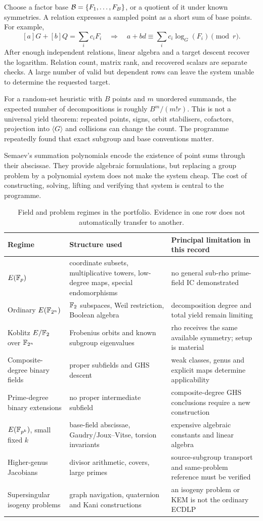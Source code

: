 Choose a factor base $\mathcal B=\{F_1,\ldots,F_B\}$, or a quotient of it under
known symmetries. A relation expresses a sampled point as a short sum of
base points. For example,
\[
 [a]G+[b]Q=\sum_i c_iF_i
 \quad\Longrightarrow\quad
 a+bd\equiv\sum_i c_i\log_G(F_i)\pmod r.
\]
After enough independent relations, linear algebra and a target descent
recover the logarithm. Relation count, matrix rank, and recovered scalars
are separate checks. A large number of valid but dependent rows can leave
the system unable to determine the requested target.

For a random-set heuristic with $B$ points and $m$ unordered summands, the
expected number of decompositions is roughly $B^m/(m!r)$. This is not a
universal yield theorem: repeated points, signs, orbit stabilisers,
cofactors, projection into $\langle G\rangle$ and collisions can change the
count. The programme repeatedly found that exact subgroup and base
conventions matter.

Semaev's summation polynomials encode the existence of point sums through
their abscissae. They provide algebraic formulations, but replacing a group
problem by a polynomial system does not make the system cheap. The cost
of constructing, solving, lifting and verifying that system is central to
the programme.\cite{semaev2004}

\begin{table}[htbp]\small
\caption{Field and problem regimes in the portfolio. Evidence in one row
does not automatically transfer to another.}
\begin{tabularx}{\linewidth}{@{}p{2.7cm}YY@{}}\toprule
Regime & Structure used & Principal limitation in this record \\\midrule
$E(\mathbb F_p)$ & coordinate subsets, multiplicative towers, low-degree maps,
special endomorphisms & no general sub-rho prime-field IC demonstrated \\
Ordinary $E(\mathbb F_{2^n})$ & $\mathbb F_2$ subspaces, Weil restriction, Boolean
algebra & decomposition degree and total yield remain limiting \\
Koblitz $E/\mathbb F_2$ over $\mathbb F_{2^n}$ & Frobenius orbits and known subgroup
eigenvalues & rho receives the same available symmetry; setup is material \\
Composite-degree binary fields & proper subfields and GHS descent &
weak classes, genus and explicit maps determine applicability \\
Prime-degree binary extensions & no proper intermediate subfield &
composite-degree GHS conclusions require a new construction \\
$E(\mathbb F_{p^k})$, small fixed $k$ & base-field abscissae, Gaudry/Joux--Vitse,
torsion invariants & expensive algebraic constants and linear algebra \\
Higher-genus Jacobians & divisor arithmetic, covers, large primes &
source-subgroup transport and same-problem reference must be verified \\
Supersingular isogeny problems & graph navigation, quaternion and Kani
constructions & an isogeny problem or KEM is not the ordinary ECDLP \\\bottomrule
\end{tabularx}
\end{table}

